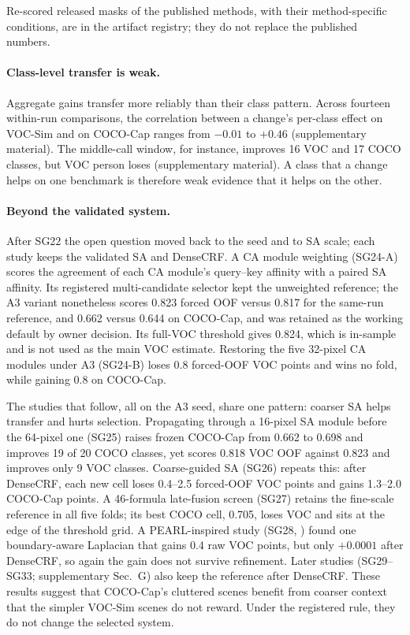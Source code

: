Re-scored released masks of the published methods, with their method-specific conditions, are in the artifact registry; they do not replace the published numbers.

\paragraph{Class-level transfer is weak.}
Aggregate gains transfer more reliably than their class pattern. Across fourteen within-run comparisons, the correlation between a change's per-class effect on VOC-Sim and on COCO-Cap ranges from $-0.01$ to $+0.46$ (supplementary material). The middle-call window, for instance, improves 16 VOC and 17 COCO classes, but VOC person loses (supplementary material). A class that a change helps on one benchmark is therefore weak evidence that it helps on the other.

\paragraph{Beyond the validated system.}
After SG22 the open question moved back to the seed and to SA scale; each study keeps the validated SA and DenseCRF. A CA module weighting (SG24-A) scores the agreement of each CA module's query--key affinity with a paired SA affinity. Its registered multi-candidate selector kept the unweighted reference; the A3 variant nonetheless scores 0.823 forced OOF versus 0.817 for the same-run reference, and 0.662 versus 0.644 on COCO-Cap, and was retained as the working default by owner decision. Its full-VOC threshold gives 0.824, which is in-sample and is not used as the main VOC estimate. Restoring the five 32-pixel CA modules under A3 (SG24-B) loses 0.8 forced-OOF VOC points and wins no fold, while gaining 0.8 on COCO-Cap.

The studies that follow, all on the A3 seed, share one pattern: coarser SA helps transfer and hurts selection. Propagating through a 16-pixel SA module before the 64-pixel one (SG25) raises frozen COCO-Cap from 0.662 to 0.698 and improves 19 of 20 COCO classes, yet scores 0.818 VOC OOF against 0.823 and improves only 9 VOC classes. Coarse-guided SA (SG26) repeats this: after DenseCRF, each new cell loses 0.4--2.5 forced-OOF VOC points and gains 1.3--2.0 COCO-Cap points. A 46-formula late-fusion screen (SG27) retains the fine-scale reference in all five folds; its best COCO cell, 0.705, loses VOC and sits at the edge of the threshold grid. A PEARL-inspired study (SG28, \cite{pei2026pearl}) found one boundary-aware Laplacian that gains 0.4 raw VOC points, but only $+0.0001$ after DenseCRF, so again the gain does not survive refinement. Later studies (SG29--SG33; supplementary Sec.~G) also keep the reference after DenseCRF. These results suggest that COCO-Cap's cluttered scenes benefit from coarser context that the simpler VOC-Sim scenes do not reward. Under the registered rule, they do not change the selected system.

